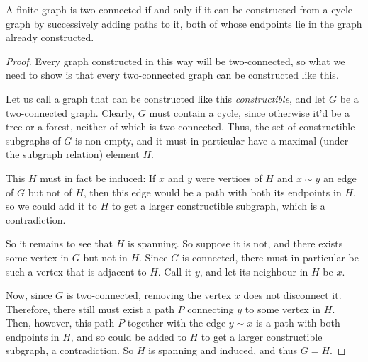 \documentclass[nobib]{tufte-handout}
\begin{document}
\begin{theorem}\label{lemma:structure_of_twoconnected_graphs}
  A finite graph is two-connected if and only if it can be constructed from a cycle graph by successively adding paths to it, both of whose endpoints lie in the graph already constructed.

  \begin{proof}
    Every graph constructed in this way will be two-connected, so what we need to show is that every two-connected graph can be constructed like this.

    Let us call a graph that can be constructed like this \emph{constructible}, and let $G$ be a two-connected graph. Clearly, $G$ must contain a cycle, since otherwise it'd be a tree or a forest, neither of which is two-connected. Thus, the set of constructible subgraphs of $G$ is non-empty, and it must in particular have a maximal (under the subgraph relation) element $H$.

    This $H$ must in fact be induced: If $x$ and $y$ were vertices of $H$ and $x\sim y$ an edge of $G$ but not of $H$, then this edge would be a path with both its endpoints in $H$, so we could add it to $H$ to get a larger constructible subgraph, which is a contradiction.

    So it remains to see that $H$ is spanning. So suppose it is not, and there exists some vertex in $G$ but not in $H$. Since $G$ is connected, there must in particular be such a vertex that is adjacent to $H$. Call it $y$, and let its neighbour in $H$ be $x$.
    
    Now, since $G$ is two-connected, removing the vertex $x$ does not disconnect it. Therefore, there still must exist a path $P$ connecting $y$ to some vertex in $H$. Then, however, this path $P$ together with the edge $y \sim x$ is a path with both endpoints in $H$, and so could be added to $H$ to get a larger constructible subgraph, a contradiction. So $H$ is spanning and induced, and thus $G = H$.
  \end{proof}
\end{theorem}
\end{document}
